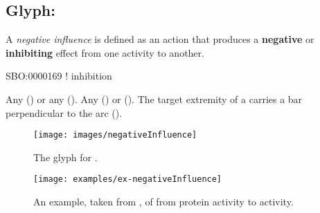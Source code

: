 \subsection{Glyph: }
\label{sec:af:negative_infl}

A \emph{negative influence} is defined as an action that produces a \textbf{negative} or \textbf{inhibiting} effect from one activity to another.

\begin{glyphDescription}

\glyphSboTerm SBO:0000169 ! inhibition

 \glyphOrigin Any  () or any  ().
 \glyphTarget Any  () or  ().
 \glyphEndPoint The target extremity of a  carries a bar perpendicular to the arc ().

\end{glyphDescription}

\begin{figure}[H]
  \centering
  \texttt{[image: images/negativeInfluence]}
  \caption{The \AF glyph for .}
  \label{fig:af:negativeInfl}
\end{figure}

\begin{figure}[H]
  \centering
  \texttt{[image: examples/ex-negativeInfluence]}
  \caption{An example, taken from , of  from  protein activity to  activity.}
  \label{fig:af:ex-NI}
\end{figure} 